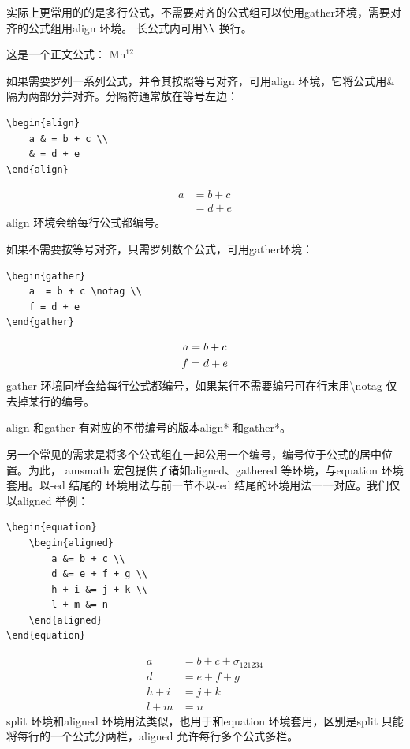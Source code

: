 实际上更常用的的是多行公式，不需要对齐的公式组可以使用gather环境，需要对齐的公式组用align 环境。
长公式内可用$ \verb|\\|$ 换行。

这是一个正文公式：
Mn$^{12}$

如果需要罗列一系列公式，并令其按照等号对齐，可用align 环境，它将公式用\& 隔为两部分并对齐。分隔符通常放在等号左边：
\begin{lstlisting}
\begin{align}
	a & = b + c \\
	& = d + e
\end{align}
\end{lstlisting}
\begin{align}
	a & = b + c \\
	  & = d + e
\end{align}
align 环境会给每行公式都编号。

如果不需要按等号对齐，只需罗列数个公式，可用gather环境：
\begin{lstlisting}
\begin{gather}
	a  = b + c \notag \\
	f = d + e 
\end{gather}
\end{lstlisting}
\begin{gather}
	a  = b + c \notag  \\
	f = d + e
\end{gather}
gather 环境同样会给每行公式都编号，如果某行不需要编号可在行末用\textbackslash{}notag 仅去掉某行的编号。

align 和gather 有对应的不带编号的版本align* 和gather*。

另一个常见的需求是将多个公式组在一起公用一个编号，编号位于公式的居中位置。为此，
amsmath 宏包提供了诸如aligned、gathered 等环境，与equation 环境套用。以-ed 结尾的
环境用法与前一节不以-ed 结尾的环境用法一一对应。我们仅以aligned 举例：
\begin{lstlisting}
\begin{equation}
	\begin{aligned}
		a &= b + c \\
		d &= e + f + g \\
		h + i &= j + k \\
		l + m &= n
	\end{aligned}
\end{equation}
\end{lstlisting}
\begin{equation}
	\begin{aligned}
		a     & = b + c+\sigma_{121234} \\
		d     & = e + f + g             \\
		h + i & = j + k                 \\
		l + m & = n
	\end{aligned}
\end{equation}
split 环境和aligned 环境用法类似，也用于和equation 环境套用，区别是split 只能
将每行的一个公式分两栏，aligned 允许每行多个公式多栏。


